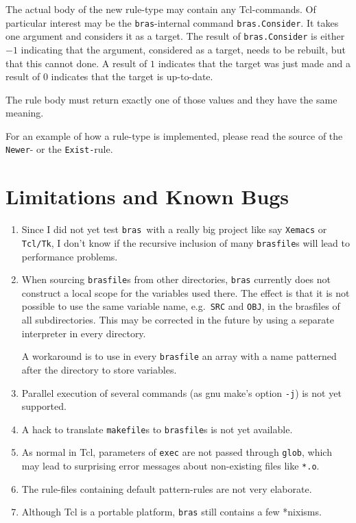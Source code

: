 \documentclass[12pt]{article}
\newcommand{\bras}{\texttt{bras}}
\begin{document}
The actual body of the new rule-type may contain any Tcl-commands. Of
particular interest may be the \bras{}-internal command
\texttt{bras.Consider}. It takes one argument and considers it as a
target. The result of \texttt{bras.Consider} is either $-1$ indicating
that the argument, considered as a target, needs to be rebuilt, but
that this cannot done. A result of $1$ indicates that the target was
just made and a result of $0$ indicates that the target is up-to-date.

The rule body must return exactly one of those values and they have
the same meaning.

For an example of how a rule-type is implemented, please read the
source of the \texttt{Newer}- or the \texttt{Exist-}rule.

\section{Limitations and Known Bugs}


\begin{enumerate}
\item
Since I did not yet test \bras\ with a really big project like say
\texttt{Xemacs} or \texttt{Tcl/Tk}, I don't know if the recursive
inclusion of many \texttt{brasfile}s will lead to performance
problems.

\item
When sourcing \texttt{brasfile}s from other directories, \bras{}
currently does not construct a local scope for the variables used
there. The effect is that it is not possible to use the same variable
name, e.g.\ \texttt{SRC} and \texttt{OBJ}, in the brasfiles
of all subdirectories. This may be corrected in the future by using a
separate interpreter in every directory.

A workaround is to use in every \texttt{brasfile} an array with a name
patterned after the directory to store variables.

\item 
Parallel execution of several commands (as gnu make's option
\texttt{-j}) is not yet supported.

\item
A hack to translate \texttt{makefile}s to \texttt{brasfile}s is not
yet available.

\item
As normal in Tcl, parameters of \texttt{exec} are not passed through
\texttt{glob}, which may lead to surprising error messages about
non-existing files like \texttt{*.o}.

\item
The rule-files containing default pattern-rules are not very
elaborate.

\item
Although Tcl is a portable platform, \bras{} still contains a few
*nixisms.


\end{enumerate}
\end{document}
